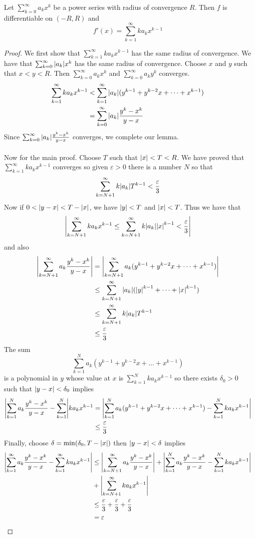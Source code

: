 \documentclass[a4paper]{article}
\begin{document}
\begin{prp}{}{} Let $\sum_{k=0}^\infty a_kx^k$ be a power series with radius of convergence $R$. Then $f$ is differentiable on $(-R,R)$ and $$f'(x)=\sum_{k=1}^\infty ka_kx^{k-1}$$ \tcbline
\begin{proof} We first show that $\sum_{k=1}^\infty ka_kx^{k-1}$ has the same radius of convergence. We have that $\sum_{k=0}^\infty \abs{a_k}x^k$ has the same radius of convergence. Choose $x$ and $y$ such that $x<y<R$. Then $\sum_{k=0}^\infty a_kx^k$ and $\sum_{k=0}^\infty a_ky^k$ converges. 
\begin{align*}
\sum_{k=1}^\infty ka_kx^{k-1}&<\sum_{k=1}^\infty\abs{a_k}(y^{k-1}+y^{k-2}x+\dots+x^{k-1})\\
&=\sum_{k=0}^\infty\abs{a_k}\frac{y^k-x^k}{y-x}
\end{align*}
Since $\sum_{k=0}^\infty\abs{a_k}\frac{y^k-x^k}{y-x}$ converges, we complete our lemma. \\~\\
Now for the main proof. Choose $T$ such that $\abs{x}<T<R$. We have proved that $\sum_{k=1}^\infty ka_kx^{k-1}$ converges so given $\varepsilon>0$ there is a number $N$ so that $$\sum_{k=N+1}^\infty k\abs{a_k}T^{k-1}<\frac{\varepsilon}{3}$$ Now if $0<\abs{y-x}<T-\abs{x}$, we have $\abs{y}<T$ and $\abs{x}<T$. Thus we have that $$\abs{\sum_{k=N+1}^\infty ka_kx^{k-1}\leq\sum_{k=N+1}^\infty k\abs{a_k}\abs{x}^{k-1}<\frac{\varepsilon}{3}}$$ and also
\begin{align*}
\abs{\sum_{k=N+1}^\infty a_k\frac{y^k-x^k}{y-x}}&=\abs{\sum_{k=N+1}^\infty a_k(y^{k-1}+y^{k-2}x+\dots+x^{k-1})}\\
&\leq\sum_{k=N+1}^\infty\abs{a_k}(\abs{y}^{k-1}+\dots+\abs{x}^{k-1})\\
&\leq\sum_{k=N+1}^\infty k\abs{a_k}T^{k-1}\\
&\leq\frac{\varepsilon}{3}
\end{align*} The sum $$\sum_{k=1}^Na_k(y^{k-1}+y^{k-2}x+\dots+x^{k-1})$$ is a polynomial in $y$ whose value at $x$ is $\sum_{k=1}^Nka_kx^{k-1}$ so there exists $\delta_0>0$ such that $\abs{y-x}<\delta_0$ implies 
\begin{align*}
\abs{\sum_{k=1}^Na_k\frac{y^k-x^k}{y-x}-\sum_{k=1}^N}ka_kx^{k-1}&=\abs{\sum_{k=1}^Na_k(y^{k-1}+y^{k-2}x+\dots+x^{k-1})-\sum_{k=1}^Nka_kx^{k-1}}\\
&\leq\frac{\varepsilon}{3}
\end{align*}
Finally, choose $\delta=\min(\delta_0,T-\abs{x})$ then $\abs{y-x}<\delta$ implies
\begin{align*}
\abs{\sum_{k=1}^\infty a_k\frac{y^k-x^k}{y-x}-\sum_{k=1}^\infty ka_kx^{k-1}}&\leq\abs{\sum_{k=N+1}^\infty a_k\frac{y^k-x^k}{y-x}}+\abs{\sum_{k=1}^N a_k\frac{y^k-x^k}{y-x}-\sum_{k=1}^N ka_kx^{k-1}}\\
&+\abs{\sum_{k=N+1}^\infty ka_kx^{k-1}}\\
&\leq\frac{\varepsilon}{3}+\frac{\varepsilon}{3}+\frac{\varepsilon}{3}\\
&=\varepsilon
\end{align*}
\end{proof}
\end{prp}
\end{document}

